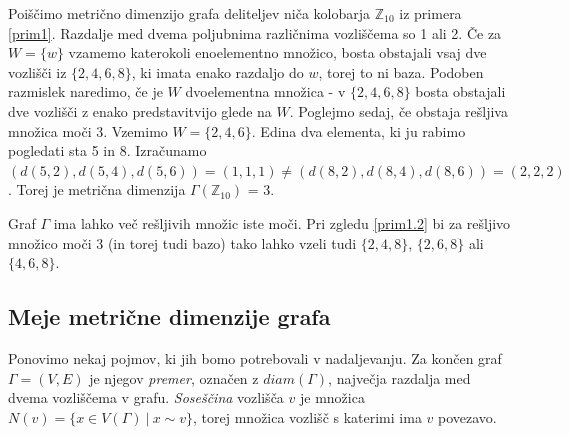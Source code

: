 \documentclass[mat1, tisk]{fmfdelo}
\newcommand{\Z}{\mathbb Z}
\begin{document}
%
\begin{zgled}\label{prim1.2}
  Poiščimo metrično dimenzijo grafa deliteljev niča kolobarja $\Z_{10}$ iz 
  primera \ref{prim1}. Razdalje 
  med dvema poljubnima različnima vozliščema so 1 ali 2. Če za $W = \{w\}$ vzamemo 
  katerokoli enoelementno množico, bosta obstajali vsaj dve vozlišči iz 
  $\{2,4,6,8\}$, ki imata enako razdaljo do $w$, torej to ni baza. Podoben razmislek 
  naredimo, če je $W$ dvoelementna množica - v $\{2,4,6,8\}$ bosta obstajali dve 
  vozlišči z enako predstavitvijo glede na $W$. Poglejmo sedaj, če obstaja rešljiva 
  množica moči 3. Vzemimo $W = \{2,4,6\}$. Edina dva elementa, ki ju rabimo pogledati 
  sta 5 in 8. Izračunamo 
  $(d(5,2),d(5,4),d(5,6)) = (1,1,1) \neq (d(8,2),d(8,4),d(8,6)) = (2,2,2)$. Torej je 
  metrična dimenzija $\Gamma(\Z_{10})$ = 3.
\end{zgled}
%
\begin{opomba}
  Graf $\Gamma$ ima lahko več rešljivih množic iste moči. Pri zgledu \ref{prim1.2} 
  bi za rešljivo množico moči 3 (in torej tudi bazo) tako lahko vzeli tudi 
  $\{2,4,8\}$, $\{2,6,8\}$ ali $\{4,6,8\}$.
\end{opomba}
%
\subsection{Meje metrične dimenzije grafa}
%
Ponovimo nekaj pojmov, ki jih bomo potrebovali v nadaljevanju. Za končen graf 
$\Gamma = (V, E)$ je njegov \emph{premer}, označen z $diam(\Gamma)$, največja 
razdalja med dvema vozliščema v grafu. \emph{Soseščina} vozlišča $v$ je 
množica $N(v) = \{ x \in V(\Gamma)~|~x \sim v \}$, torej množica vozlišč 
s katerimi ima $v$ povezavo. 
\end{document}
